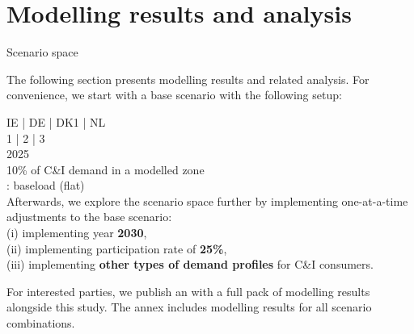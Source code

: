 \section{Modelling results and analysis}



\begin{frame}{Scenario space}

  {\small
  The following section presents modelling results and related analysis. 
  For convenience, we start with a \alert{base scenario} 
  with the following setup:

     IE | DE | DK1 | NL \\
     1 | 2 | 3 \\
     2025 \\ 
     10\% of C\&I demand in a modelled zone \\
    : baseload (flat) \\
  
  \vspace{0.3cm}
  Afterwards, we explore the scenario space further by implementing one-at-a-time 
  adjustments to the base scenario: \\
  (i) implementing year {\bf 2030}, \\
  (ii) implementing participation rate of {\bf 25\%}, \\ 
  (iii) implementing {\bf other types of demand profiles} for C\&I consumers.
  
  \vspace{0.3cm}
  For interested parties, we publish an  
  with a full pack of modelling results alongside this study. The annex 
  includes modelling results for all scenario combinations.
  }
  \end{frame}


